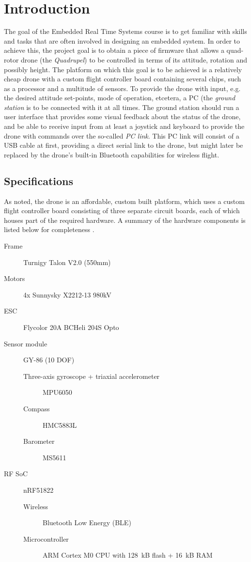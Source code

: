 \documentclass[final]{article}
\begin{document}
\section{Introduction}
The goal of the Embedded Real Time Systems course is to get familiar with skills and tasks that are often involved in designing an embedded system.
In order to achieve this, the project goal is to obtain a piece of firmware that allows a quad-rotor drone (the \emph{Quadrupel}) to be controlled in terms of its attitude, rotation and possibly height.
The platform on which this goal is to be achieved is a relatively cheap drone with a custom flight controller board containing several chips, such as a processor and a multitude of sensors.
To provide the drone with input, e.g. the desired attitude set-points, mode of operation, etcetera, a PC (the \emph{ground station} is to be connected with it at all times.
The ground station should run a user interface that provides some visual feedback about the status of the drone, and be able to receive input from at least a joystick and keyboard to provide the drone with commands over the so-called \emph{PC link}.
This PC link will consist of a USB cable at first, providing a direct serial link to the drone, but might later be replaced by the drone's built-in Bluetooth capabilities for wireless flight.

\subsection{Specifications}
As noted, the drone is an affordable, custom built platform, which uses a custom flight controller board consisting of three separate circuit boards, each of which houses part of the required hardware.
A summary of the hardware components is listed below for completeness \cite{langendoen2016specs}.

\begin{description}
	\item[Frame] Turnigy Talon V2.0 (550mm)
	\item[Motors] 4x Sunnysky X2212-13 980kV
	\item[ESC] Flycolor 20A BCHeli 204S Opto
	\item[Sensor module] GY-86 (10 DOF)
	\begin{description}
	  	\item[Three-axis gyroscope + triaxial accelerometer] MPU6050
	  	\item[Compass] HMC5883L
	  	\item[Barometer] MS5611
	\end{description}
	\item[RF SoC] nRF51822
	\begin{description}
		\item[Wireless] Bluetooth Low Energy (BLE)
		\item[Microcontroller] ARM Cortex M0 CPU with \SI{128}{kB} flash + \SI{16}{kB} RAM
	\end{description}
\end{description}
\end{document}
